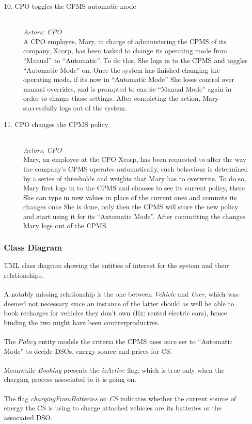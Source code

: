 \documentclass[11pt]{article}
\begin{document}
\begin{description}
    \newpage
    
    \item [10. CPO toggles the CPMS automatic mode] \hfill \\
        \textit{Actors: CPO} \\
        A CPO employee, Mary, in charge of administering the CPMS of its company, Xcorp, has been tasked to change its operating mode from “Manual” to “Automatic”. To do this, She logs in to the CPMS and toggles “Automatic Mode” on. Once the system has finished changing the operating mode, if its now in “Automatic Mode” She loses control over manual overrides, and is prompted to enable “Manual Mode” again in order to change those settings. After completing the action, Mary successfully logs out of the system. \hfill \\
    \item [11. CPO changes the CPMS policy] \hfill \\
        \textit{Actors: CPO} \\
        Mary, an employee at the CPO Xcorp, has been requested to alter the way the company's CPMS operates automatically, such behaviour is determined by a series of thresholds and weights that Mary has to overwrite. To do so, Mary first logs in to the CPMS and chooses to see its current policy, there She can type in new values in place of the current ones and commits its changes once She is done, only then the CPMS will store the new policy and start using it for its “Automatic Mode”. After committing the changes Mary logs out of the CPMS. \hfill \\
\end{description}

\subsubsection{Class Diagram}
\label{subsection:classDiagram}

UML class diagram showing the entities of interest for the system and their relationships. \\
\\
A notably missing relationship is the one between \textit{Vehicle} and \textit{User}, which was deemed not necessary since an instance of the latter should as well be able to book recharges for vehicles they don't own (Ex: rented electric cars), hence binding the two might have been counterproductive. \\
\\
The \textit{Policy} entity models the criteria the CPMS uses once set to “Automatic Mode” to decide DSOs, energy source and prices for CS. \\
\\
Meanwhile \textit{Booking} presents the \textit{isActive} flag, which is true only when the charging process associated to it is going on. \\
\\
The flag \textit{chargingFromBatteries} on \textit{CS} indicates whether the current source of energy the CS is using to charge attached vehicles are its batteries or the associated DSO.
\end{document}
